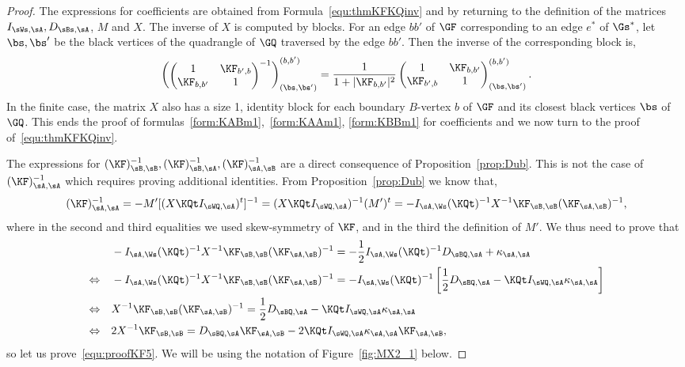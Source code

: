 \documentclass[a4paper,twoside,11pt]{article}
\begin{document}
\begin{proof}
The expressions for coefficients are obtained from Formula~\eqref{equ:thmKFKQinv} and 
by returning to the definition of the matrices $I_{\sWs,\sA}, D_{\sBs,\sA}$,
$M$ and $X$. The inverse of $X$ is computed by blocks. 
For an edge $bb'$ of $\GF$ corresponding to an edge $e^*$ of $\Gs^*$, let $\bs,\bs'$ be the black vertices of the quadrangle of 
$\GQ$ traversed by the edge $bb'$. Then the inverse of the corresponding block is,
\begin{equation}\label{equ:Xinv}
\begin{pmatrix}
\begin{pmatrix}
1&\KF_{b',b}\\ 
\KF_{b,b'}&1
\end{pmatrix}^{-1}
\end{pmatrix}_{(\bs,\bs')}^{(b,b')}=
\frac{1}{1+|\KF_{b,b'}|^2}
\begin{pmatrix}
1&\KF_{b,b'}\\
\KF_{b',b}&1
\end{pmatrix}_{(\bs,\bs')}^{(b,b')}.
\end{equation}
In the finite case, the matrix $X$ also has a size 1, identity block for each boundary $B$-vertex $b$ of $\GF$ and its closest black vertices $\bs$
of $\GQ$. This ends the proof of formulas~\eqref{form:KABm1},~\eqref{form:KAAm1},
\eqref{form:KBBm1} for coefficients and we now turn to the proof of~\eqref{equ:thmKFKQinv}.

The expressions for $(\KF)^{-1}_{\sB,\sB},(\KF)^{-1}_{\sB,\sA},(\KF)^{-1}_{\sA,\sB}$ are a direct consequence of Proposition~\ref{prop:Dub}.
This is not the case of $(\KF)^{-1}_{\sA,\sA}$ which requires proving additional identities. From Proposition~\ref{prop:Dub}
we know that,
\[
(\KF)^{-1}_{\sA,\sA}=-M'[(X\KQt I_{\sWQ,\sA})^t]^{-1}=(X\KQt I_{\sWQ,\sA})^{-1}(M')^t=
-I_{\sA,\Ws}(\KQt)^{-1}X^{-1}\KF_{\sB,\sB}(\KF_{\sA,\sB})^{-1},
\]
where in the second and third equalities we used skew-symmetry of $\KF$, and in the third the definition of $M'$.
We thus need to prove that 
\begin{align}\label{equ:proofKF5}
&-I_{\sA,\Ws}(\KQt)^{-1}X^{-1}\KF_{\sB,\sB}(\KF_{\sA,\sB})^{-1}=-\frac{1}{2}I_{\sA,\Ws}(\KQt)^{-1}D_{\sBQ,\sA}+\kappa_{\sA,\sA}\nonumber\\
\Leftrightarrow \quad & 
-I_{\sA,\Ws}(\KQt)^{-1}X^{-1}\KF_{\sB,\sB}(\KF_{\sA,\sB})^{-1}=
-I_{\sA,\Ws}(\KQt)^{-1}\left[\frac{1}{2}D_{\sBQ,\sA}-\KQt I_{\sWQ,\sA}\kappa_{\sA,\sA}\right]\nonumber\\
\Leftrightarrow \quad& X^{-1}\KF_{\sB,\sB}(\KF_{\sA,\sB})^{-1}=\frac{1}{2}D_{\sBQ,\sA}-\KQt I_{\sWQ,\sA}\kappa_{\sA,\sA}\nonumber\\
\Leftrightarrow \quad& 2X^{-1}\KF_{\sB,\sB}=D_{\sBQ,\sA}\KF_{\sA,\sB}-2 \KQt I_{\sWQ,\sA} \kappa_{\sA,\sA}\KF_{\sA,\sB},
\end{align}
so let us prove~\eqref{equ:proofKF5}. We will be using the notation of Figure~\ref{fig:MX2_1} below.


\end{proof}
\end{document}
